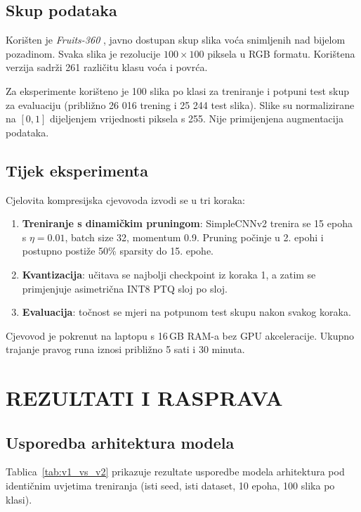 \documentclass[letterpaper, 10 pt, conference]{ieeeconf}
\begin{document}
\subsection{Skup podataka}

Korišten je \textit{Fruits-360} \cite{fruits360}, javno dostupan skup slika voća snimljenih nad bijelom pozadinom.
Svaka slika je rezolucije $100\times100$ piksela u RGB formatu.
Korištena verzija sadrži 261 različitu klasu voća i povrća.

Za eksperimente korišteno je 100 slika po klasi za treniranje i potpuni test skup za evaluaciju (približno 26 016 trening i 25 244 test slika).
Slike su normalizirane na $[0,1]$ dijeljenjem vrijednosti piksela s 255.
Nije primijenjena augmentacija podataka.

\subsection{Tijek eksperimenta}

Cjelovita kompresijska cjevovoda izvodi se u tri koraka:
\begin{enumerate}
  \item \textbf{Treniranje s dinamičkim pruningom}: SimpleCNNv2 trenira se 15 epoha s $\eta = 0.01$, batch size 32, momentum 0.9. Pruning počinje u 2. epohi i postupno postiže 50\% sparsity do 15. epohe.
  \item \textbf{Kvantizacija}: učitava se najbolji checkpoint iz koraka 1, a zatim se primjenjuje asimetrična INT8 PTQ sloj po sloj.
  \item \textbf{Evaluacija}: točnost se mjeri na potpunom test skupu nakon svakog koraka.
\end{enumerate}

Cjevovod je pokrenut na laptopu s 16\,GB RAM-a bez GPU akceleracije. Ukupno trajanje pravog runa iznosi približno 5 sati i 30 minuta.

\section{\textbf{REZULTATI I RASPRAVA}}

\subsection{Usporedba arhitektura modela}

Tablica~\ref{tab:v1_vs_v2} prikazuje rezultate usporedbe modela arhitektura pod identičnim uvjetima treniranja (isti seed, isti dataset, 10 epoha, 100 slika po klasi).
\end{document}
